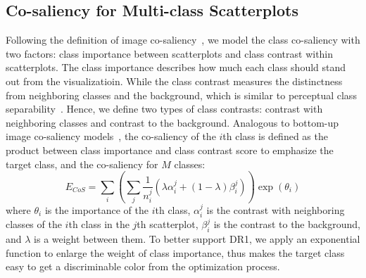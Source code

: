 \subsection{Co-saliency for Multi-class Scatterplots }
Following the definition of image co-saliency~\cite{Jacobs10}, we model the class co-saliency with two factors: class importance between scatterplots and class contrast within scatterplots. The class importance describes how much each class should stand out from the visualizatioin. While the class contrast measures the distinctness from neighboring classes and the background, which is similar to perceptual class separability~\cite{Aupetit02,Wang2018}. Hence, we define two types of class contrasts: contrast with neighboring classes and contrast to the background.
Analogous to bottom-up image co-saliency models~\cite{Jacobs10,Fu13}, the co-saliency of the $i$th class is defined as the product between class importance and  class contrast score to emphasize the target class, and the co-saliency for $M$ classes:
\begin{equation}
E_{CoS} = \sum_i    \left(\sum_j \frac{1}{n^j_i}(\lambda \alpha^j_i + (1-\lambda) \beta^j_i) \right)  \exp(\theta_i)
	\label{eq:cosaliency}
\end{equation}
where $\theta_i$ is the importance of the $i$th class, $\alpha^j_i$ is the contrast with neighboring classes of the $i$th class in the $j$th scatterplot, $\beta^j_i$  is the contrast to the background, and $\lambda$ is a weight between them.
To better support DR1, we apply an exponential function to enlarge the weight of class importance, thus makes the target class easy to get a discriminable color from the optimization process.


